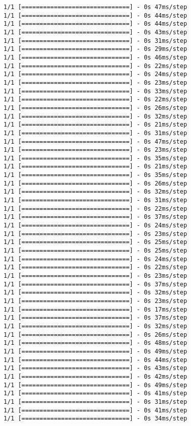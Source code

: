 \documentclass[11pt]{article}
\begin{document}
\begin{Verbatim}[commandchars=\\\{\}]
1/1 [==============================] - 0s 47ms/step
1/1 [==============================] - 0s 44ms/step
1/1 [==============================] - 0s 44ms/step
1/1 [==============================] - 0s 43ms/step
1/1 [==============================] - 0s 31ms/step
1/1 [==============================] - 0s 29ms/step
1/1 [==============================] - 0s 46ms/step
1/1 [==============================] - 0s 22ms/step
1/1 [==============================] - 0s 24ms/step
1/1 [==============================] - 0s 23ms/step
1/1 [==============================] - 0s 33ms/step
1/1 [==============================] - 0s 22ms/step
1/1 [==============================] - 0s 26ms/step
1/1 [==============================] - 0s 32ms/step
1/1 [==============================] - 0s 21ms/step
1/1 [==============================] - 0s 31ms/step
1/1 [==============================] - 0s 47ms/step
1/1 [==============================] - 0s 23ms/step
1/1 [==============================] - 0s 35ms/step
1/1 [==============================] - 0s 21ms/step
1/1 [==============================] - 0s 35ms/step
1/1 [==============================] - 0s 26ms/step
1/1 [==============================] - 0s 32ms/step
1/1 [==============================] - 0s 31ms/step
1/1 [==============================] - 0s 22ms/step
1/1 [==============================] - 0s 37ms/step
1/1 [==============================] - 0s 24ms/step
1/1 [==============================] - 0s 23ms/step
1/1 [==============================] - 0s 25ms/step
1/1 [==============================] - 0s 25ms/step
1/1 [==============================] - 0s 24ms/step
1/1 [==============================] - 0s 22ms/step
1/1 [==============================] - 0s 23ms/step
1/1 [==============================] - 0s 37ms/step
1/1 [==============================] - 0s 32ms/step
1/1 [==============================] - 0s 23ms/step
1/1 [==============================] - 0s 17ms/step
1/1 [==============================] - 0s 37ms/step
1/1 [==============================] - 0s 32ms/step
1/1 [==============================] - 0s 26ms/step
1/1 [==============================] - 0s 48ms/step
1/1 [==============================] - 0s 49ms/step
1/1 [==============================] - 0s 44ms/step
1/1 [==============================] - 0s 43ms/step
1/1 [==============================] - 0s 42ms/step
1/1 [==============================] - 0s 49ms/step
1/1 [==============================] - 0s 41ms/step
1/1 [==============================] - 0s 31ms/step
1/1 [==============================] - 0s 41ms/step
1/1 [==============================] - 0s 34ms/step

\end{Verbatim}
\end{document}

